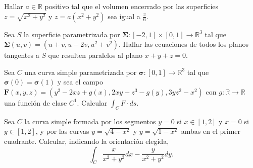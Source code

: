 
\begin{question}
    Hallar $a \in \mathbb{R}$ positivo tal que el volumen encerrado por las superficies 
    $z = \sqrt{x^2+y^2}$ y $z = a \left( x^2+y^2 \right)$ sea igual a $\frac{\pi}{6}$.
\end{question}


\begin{question}
    Sea $S$ la superficie parametrizada por $\boldsymbol{\Sigma}: \left[-2,1\right] \times \left[0,1\right] \rightarrow \mathbb{R}^3$ tal que 
    $\boldsymbol{\Sigma}(u,v) = (u+v,u-2v,u^2+v^2)$. Hallar las ecuaciones de todos los planos tangentes 
    a $S$ que resulten paralelos al plano $x+y+z=0$.
\end{question}


\begin{question}
    Sea $C$ una curva simple parametrizada por $\boldsymbol{\sigma}:[0,1] \rightarrow \mathbb{R}^3$ tal que 
    $\boldsymbol{\sigma}(0)=\boldsymbol{\sigma}(1)$  y sea el campo $\boldsymbol{F}(x,y,z) = (y^2-2xz+g(x),2xy+z^3-g(y),3yz^2-x^2)$
    con $g:\mathbb{R}\rightarrow \mathbb{R}$ una función de clase $C^1$. Calcular $\int_{C}F \cdot ds$.
\end{question}



\begin{question}
    Sea $C$ la curva simple formada por los segmentos $y=0$ si $x \in [1,2]$ y 
    $x=0$ si $y \in [1,2]$, y por las curvas $y=\sqrt{4-x^2}$ y $y=\sqrt{1-x^2}$ ambas en el primer
    cuadrante. Calcular, indicando la orientación elegida,
    \begin{equation*}
        \int_{C} \frac{x}{x^2+y^2}dx - \frac{y}{x^2+y^2}dy.
    \end{equation*}
\end{question}

